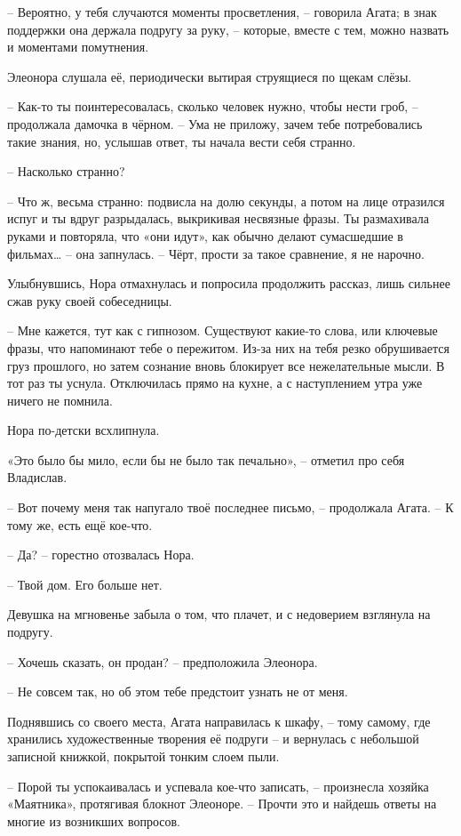 \documentclass[
  a5paperpaper,
  DIV=11,
  numbers=noendperiod]{scrreprt}
\begin{document}
-- Вероятно, у тебя случаются моменты просветления, -- говорила Агата; в
знак поддержки она держала подругу за руку, -- которые, вместе с тем,
можно назвать и моментами помутнения.

Элеонора слушала её, периодически вытирая струящиеся по щекам слёзы.

-- Как-то ты поинтересовалась, сколько человек нужно, чтобы нести гроб,
-- продолжала дамочка в чёрном. -- Ума не приложу, зачем тебе
потребовались такие знания, но, услышав ответ, ты начала вести себя
странно.

-- Насколько странно?

-- Что ж, весьма странно: подвисла на долю секунды, а потом на лице
отразился испуг и ты вдруг разрыдалась, выкрикивая несвязные фразы. Ты
размахивала руками и повторяла, что «они идут», как обычно делают
сумасшедшие в фильмах\ldots{} -- она запнулась. -- Чёрт, прости за такое
сравнение, я не нарочно.

Улыбнувшись, Нора отмахнулась и попросила продолжить рассказ, лишь
сильнее сжав руку своей собеседницы.

-- Мне кажется, тут как с гипнозом. Существуют какие-то слова, или
ключевые фразы, что напоминают тебе о пережитом. Из-за них на тебя резко
обрушивается груз прошлого, но затем сознание вновь блокирует все
нежелательные мысли. В тот раз ты уснула. Отключилась прямо на кухне, а
с наступлением утра уже ничего не помнила.

Нора по-детски всхлипнула.

«Это было бы мило, если бы не было так печально», -- отметил про себя
Владислав.

-- Вот почему меня так напугало твоё последнее письмо, -- продолжала
Агата. -- К тому же, есть ещё кое-что.

-- Да? -- горестно отозвалась Нора.

-- Твой дом. Его больше нет.

Девушка на мгновенье забыла о том, что плачет, и с недоверием взглянула
на подругу.

-- Хочешь сказать, он продан? -- предположила Элеонора.

-- Не совсем так, но об этом тебе предстоит узнать не от меня.

Поднявшись со своего места, Агата направилась к шкафу, -- тому самому,
где хранились художественные творения её подруги -- и вернулась с
небольшой записной книжкой, покрытой тонким слоем пыли.

-- Порой ты успокаивалась и успевала кое-что записать, -- произнесла
хозяйка «Маятника», протягивая блокнот Элеоноре. -- Прочти это и найдешь
ответы на многие из возникших вопросов.
\end{document}
